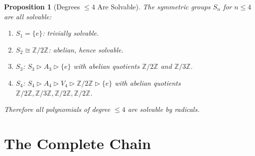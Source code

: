 \documentclass[11pt,a4paper]{article}
\theoremstyle{plain}
\newtheorem{proposition}[theorem]{Proposition}
\theoremstyle{definition}
\newcommand{\Z}{\mathbb{Z}}
\begin{document}
\begin{proposition}[Degrees $\le 4$ Are Solvable]\label{prop:solvable-small}
The symmetric groups $S_{n}$ for $n \le 4$ are all solvable:
\begin{enumerate}[nosep]
  \item $S_{1} = \{e\}$: trivially solvable.
  \item $S_{2} \cong \Z/2\Z$: abelian, hence solvable.
  \item $S_{3}$: $S_{3} \rhd A_{3} \rhd \{e\}$ with abelian quotients
    $\Z/2\Z$ and $\Z/3\Z$.
  \item $S_{4}$: $S_{4} \rhd A_{4} \rhd V_{4} \rhd \Z/2\Z \rhd \{e\}$
    with abelian quotients $\Z/2\Z, \Z/3\Z, \Z/2\Z, \Z/2\Z$.
\end{enumerate}
Therefore all polynomials of degree $\le 4$ are solvable by radicals.
\end{proposition}

\section{The Complete Chain}\label{sec:chain}
\end{document}

